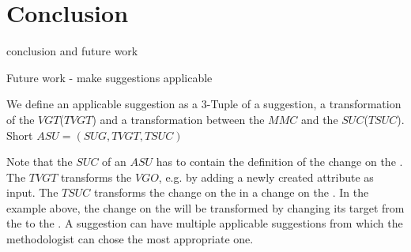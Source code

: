 \section{Conclusion}
\label{sec:Conclusion}

conclusion and future work \cite{braun_classification_2014}

Future work - make suggestions applicable 
 \begin{definition}
We define an applicable suggestion as a 3-Tuple of a suggestion, a transformation of the $VGT$($TVGT$) and a transformation between the $MMC$ and the $SUC$($TSUC$). Short $ASU = (SUG, TVGT, TSUC)$
\end{definition}
 
Note that the $SUC$ of an $ASU$ has to contain the definition of the change on the \viewtype \metamodel. The $TVGT$ transforms the $VGO$, e.g. by adding a newly created attribute as input. The $TSUC$ transforms the change on the \metamodel in a change on the \viewtype \metamodel. In the example above, the change on the \metamodel will be transformed by changing its target from the \metamodel to the \viewtype \metamodel. A suggestion can have multiple applicable suggestions from which the methodologist can chose the most appropriate one.
